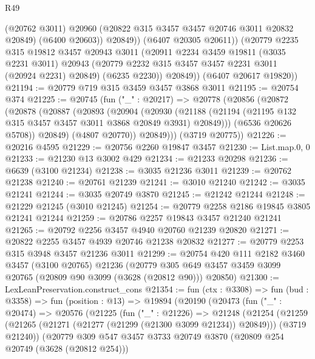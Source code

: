 \begin{lexlean}{R49}
\begin{coremodule}
                (@20762 @3011)
                @20960
                (@20822 @315 @3457 @3457 @20746 @3011 @20832 @20849)
                (@6400 @20603))
              @20849))
          (@6407 @20305 @20611))
        (@20779
          @2235
          @315
          @19812
          @3457
          @20943
          @3011
          (@20911
            @2234
            @3459
            @19811
            (@3035 @2231 @3011)
            @20943
            (@20779 @2232 @315 @3457 @3457 @2231 @3011 (@20924 @2231) @20849)
            (@6235 @2230))
          @20849))
      (@6407 @20617 @19820))
@21194 := @20779 @719 @315 @3459 @3457 @3868 @3011
@21195 := @20754 @374
@21225 := @20745
    (fun ("_" : @20217) =>
    @20778
      (@20856
        (@20872
          (@20878
            (@20887
              (@20893
                (@20904
                  (@20930
                    (@21188
                      (@21194 (@21195 @132 @315 @3457 @3457 @3011 @3868 @20849 @3931) @20849)))
                  (@6536 @20626 @5708))
                @20849)
              (@4807 @20770))
            @20849)))
      (@3719 @20775))
@21226 := @20216 @4595
@21229 := @20756 @2260 @19847 @3457
@21230 := List.map.{0, 0}
@21233 := @21230 @13 @3002 @429
@21234 := @21233 @20298
@21236 := @6639 (@3100 @21234)
@21238 := @3035 @21236 @3011
@21239 := @20762 @21238
@21240 := @20761 @21239
@21241 := @3010 @21240
@21242 := @3035 @21241
@21244 := @3035 @20749 @3870
@21245 := @21242 @21244
@21248 := @21229 @21245 (@3010 @21245)
@21254 := @20779 @2258 @2186 @19845 @3805 @21241 @21244
@21259 := @20786 @2257 @19843 @3457 @21240 @21241
@21265 := @20792 @2256 @3457 @4940 @20760 @21239 @20820
@21271 := @20822 @2255 @3457 @4939 @20746 @21238 @20832
@21277 := @20779 @2253 @315 @3948 @3457 @21236 @3011
@21299 := @20754
    @420
    @111
    @2182
    @3460
    @3457
    (@3100 @20765)
    @21236
    (@20779 @305 @649 @3457 @3459 @3099 @20765 (@20809 @90 @3099 (@3628 (@20812 @90))) @20850)
@21300 := LexLeanPreservation.construct_cons
@21354 := fun (ctx : @3308) =>
  fun (bud : @3358) =>
  fun (position : @13) =>
  @19894
    (@20190
      (@20473
        (fun ("_" : @20474) =>
        @20576
          (@21225
            (fun ("_" : @21226) =>
            @21248
              (@21254
                (@21259
                  (@21265 (@21271 (@21277 (@21299 (@21300 @3099 @21234)) @20849)))
                  (@3719 @21240))
                (@20779
                  @309
                  @547
                  @3457
                  @3733
                  @20749
                  @3870
                  (@20809 @254 @20749 (@3628 (@20812 @254)))

\end{coremodule}
\end{lexlean}
